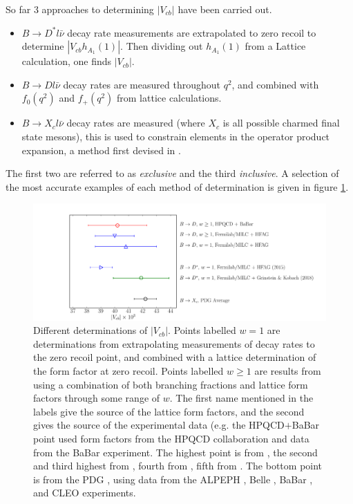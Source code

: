 So far 3 approaches to determining $|V_{cb}|$ have been carried out.
\begin{itemize}
\item
  $B\to D^* l\bar{\nu}$ decay rate measurements are extrapolated to zero recoil to determine $|V_{cb}h_{A_1}(1)|$. Then dividing out $h_{A_1}(1)$ from a Lattice calculation, one finds $|V_{cb}|$.
\item
  $B\to D l\bar{\nu}$ decay rates are measured throughout $q^2$, and combined with $f_0(q^2)$ and $f_+(q^2)$ from lattice calculations.
\item
  $B\to X_c l\bar{\nu}$ decay rates are measured (where $X_c$ is all possible charmed final state mesons), this is used to constrain elements in the operator product expansion, a method first devised in \cite{Bigi:1996si,Hoang:1998hm}.
\end{itemize}
The first two are referred to as {\it{exclusive}} and the third {\it{inclusive}}. A selection of the most accurate examples of each method of determination is given in figure \ref{fig:Vcb_plot}.
\begin{figure}
  \vspace{-10pt}
  \begin{center}
    \includegraphics[width=1.0\textwidth]{images/Vcb_plot.pdf}
  \end{center}
  \vspace{-20pt}
  \caption{Different determinations of $|V_{cb}|$. Points labelled $w=1$ are determinations from extrapolating measurements of decay rates to the zero recoil point, and combined with a lattice determination of the form factor at zero recoil. Points labelled $w\geq 1$ are results from using a combination of both branching fractions and lattice form factors through some range of $w$. The first name mentioned in the labels give the source of the lattice form factors, and the second gives the source of the experimental data (e.g. the HPQCD$+$BaBar point used form factors from the HPQCD collaboration and data from the BaBar experiment. The highest point is from \cite{Na:2015kha}, the second and third highest from \cite{Lattice:2015rga}, fourth from \cite{Bailey:2014tva}, fifth from \cite{Grinstein:2017nlq}. The bottom point is from the PDG \cite{PhysRevD.98.030001}, using data from the ALPEPH \cite{BUSKULIC1995236}, Belle \cite{Abe:2001yf}, BaBar \cite{Aubert:2008yv,Aubert:2009ac}, and CLEO \cite{Bartelt:1998dq} experiments.
\label{fig:Vcb_plot}}
\end{figure}

